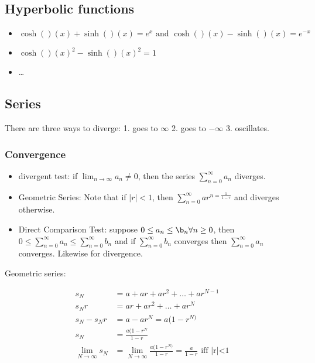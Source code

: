 \documentclass[class=article,crop=false]{standalone}
\begin{document}
\subsection{Hyperbolic functions}
\begin{itemize}
	\item $\cosh( )(x )+\sinh( )(x )=e^{x} \text{ and } \cosh( )(x )-\sinh( )(x )=e^{-x} $ 
	\item $\cosh( )(x )^2-\sinh( )(x )^2=1$
	\item \ldots
\end{itemize}

\subsection{Series}
There are three ways to diverge: 1. goes to $\infty$ 2. goes to $-\infty$ 3. oscillates.\\

\subsubsection{Convergence}
\begin{itemize}
	\item divergent test: if $\lim_{ n \to \infty} a_n \neq 0$, then the series $\sum_{ n=0}^{\infty} a_n$ diverges. 
	\item Geometric Series: Note that if $ |r|<1 $, then  $\sum_{ n=0}^{\infty} a r^{n=\frac{1}{1-r}}$ and diverges otherwise.
	\item Direct Comparison Test: suppose $0 \leq a_n \leq \b_n \forall n \geq 0$, then $0 \leq \sum_{ n=0}^{\infty} a_n \leq \sum_{ n=0}^{\infty} b_n $ and if $\sum_{ n=0}^{\infty} b_n$ converges then $\sum_{ n=0}^{\infty} a_n$ converges. Likewise for divergence.
\end{itemize}
Geometric series:
\begin{prf}
\begin{align*}
	s_N &= a + ar+ ar^2 + \ldots + ar^{N-1} \\
	s_N r &= ar + ar^2+\ldots+ ar^{N} \\
	s_N - s_N r &= a - ar^{N} = a(1-r^{N)}\\
	s_N &= \frac{a(1-r^{N}}{1-r} \\
	\lim_{ N \to \infty} s_N &= \lim_{ N \to \infty} \frac{a(1-r^{N)}}{1-r} = \frac{a}{1-r} \text{ iff |r|<1} 
\end{align*}
\end{prf}
\end{document}
